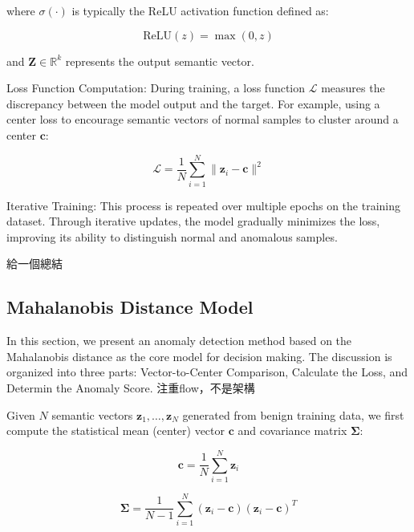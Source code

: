 \begin{ZhChapter}
    where $\sigma(\cdot)$ is typically the ReLU activation function defined as:

    \begin{equation}
        \mathrm{ReLU}(z) = \max(0, z)
    \end{equation}

    and $\mathbf{Z} \in \mathbb{R}^k$ represents the output semantic vector.

    Loss Function Computation: During training, a loss function $\mathcal{L}$ measures the discrepancy between the model output and the target. For example, using a center loss \cite{wen2016discriminative} to encourage semantic vectors of normal samples to cluster around a center $\mathbf{c}$:


    \begin{equation}
        \mathcal{L} = \frac{1}{N} \sum_{i=1}^N \| \mathbf{z}_i - \mathbf{c} \|^2
    \end{equation}

    Iterative Training: This process is repeated over multiple epochs on the training dataset. Through iterative updates, the model gradually minimizes the loss, improving its ability to distinguish normal and anomalous samples.

    給一個總結



    \subsection{Mahalanobis Distance Model}
    In this section, we present an anomaly detection method based on the Mahalanobis distance as the core model for decision making. The discussion is organized into three parts: Vector-to-Center Comparison, Calculate the Loss, and Determin the Anomaly Score.
    注重flow，不是架構

    Given $N$ semantic vectors $\mathbf{z}_1, \dots, \mathbf{z}_N$ generated from benign training data, we first compute the statistical mean (center) vector $\boldsymbol{c}$ and covariance matrix $\boldsymbol{\Sigma}$:

    \begin{equation}
        \boldsymbol{c} = \frac{1}{N} \sum_{i=1}^{N} \mathbf{z}_i
    \end{equation}

    \begin{equation}
        \boldsymbol{\Sigma} = \frac{1}{N - 1} \sum_{i=1}^{N} (\mathbf{z}_i - \boldsymbol{c})(\mathbf{z}_i - \boldsymbol{c})^T
    \end{equation}




\end{ZhChapter}

